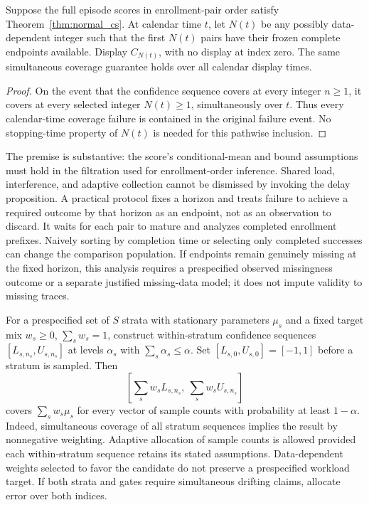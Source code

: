 \begin{proposition}
\label{prop:delay}
Suppose the full episode scores in enrollment-pair order satisfy
Theorem~\ref{thm:normal_cs}. At calendar time $t$, let $N(t)$ be any
possibly data-dependent integer such that the first $N(t)$ pairs have
their frozen complete endpoints available. Display $C_{N(t)}$, with no
display at index zero. The same simultaneous coverage guarantee holds
over all calendar display times.
\end{proposition}
\begin{proof}
On the event that the confidence sequence covers at every integer
$n\geq1$, it covers at every selected integer $N(t)\geq1$, simultaneously
over $t$. Thus every calendar-time coverage failure is contained in the
original failure event. No stopping-time property of $N(t)$ is needed
for this pathwise inclusion.
\end{proof}

The premise is substantive: the score's conditional-mean and bound
assumptions must hold in the filtration used for enrollment-order
inference. Shared load, interference, and adaptive collection cannot
be dismissed by invoking the delay proposition. A practical protocol
fixes a horizon and treats failure to achieve a required outcome by that
horizon as an endpoint, not as an observation to discard. It waits for
each pair to mature and analyzes completed enrollment prefixes. Naively
sorting by completion time or selecting only completed successes can
change the comparison population. If endpoints remain genuinely missing
at the fixed horizon, this analysis requires a prespecified observed
missingness outcome or a separate justified missing-data model; it does
not impute validity to missing traces.

For a prespecified set of $S$ strata with stationary parameters $\mu_s$
and a fixed target mix $w_s\geq0$, $\sum_sw_s=1$, construct within-stratum
confidence sequences $[L_{s,n_s},U_{s,n_s}]$ at levels $\alpha_s$ with
$\sum_s\alpha_s\leq\alpha$. Set $[L_{s,0},U_{s,0}]=[-1,1]$ before a
stratum is sampled. Then
\begin{equation}
 \left[\sum_s w_sL_{s,n_s},\ \sum_s w_sU_{s,n_s}\right]
 \label{eq:stratified_cs}
\end{equation}
covers $\sum_sw_s\mu_s$ for every vector of sample counts with probability
at least $1-\alpha$. Indeed, simultaneous coverage of all stratum
sequences implies the result by nonnegative weighting. Adaptive
allocation of sample counts is allowed provided each within-stratum
sequence retains its stated assumptions. Data-dependent weights selected
to favor the candidate do not preserve a prespecified workload target.
If both strata and gates require simultaneous drifting claims, allocate
error over both indices.

